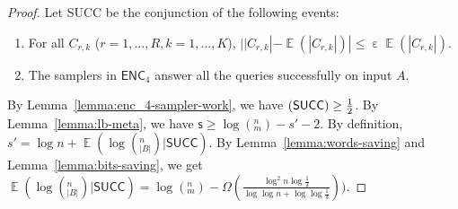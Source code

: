\documentclass[10pt]{article}
\DeclareMathOperator*{\E}{\mathbb{E}}
\let\Pr\relax
\DeclareMathOperator*{\Pr}{\mathbb{P}}
\DeclareMathOperator*{\eps}{\varepsilon}
\newcommand{\success}{\textsf{SUCC}\xspace}
\newcommand{\enc}{\textsf{ENC}\xspace}
\newcommand{\s}{\textsf{s}\xspace}
\begin{document}
\begin{proof}
  Let \success be the conjunction of the following events:
  \begin{enumerate}
    \item For all $C_{r,k}$ ($r=1,\ldots, R, k=1,\ldots, K$), $||C_{r,k}|-\E(|C_{r,k}|)|\le \eps \E(|C_{r,k}|)$.
    \item The samplers in $\enc_4$ answer all the queries successfully on input $A$.
  \end{enumerate}
  By Lemma~\ref{lemma:enc_4-sampler-work}, we have $\Pr(\success)\ge \frac{1}{2}$. By Lemma~\ref{lemma:lb-meta}, we have $\s\ge \log (^n_m) - s' -2$. By definition, $s'=\log n + \E(\log (^n_{|B|})|\success)$. By Lemma~\ref{lemma:words-saving} and Lemma~\ref{lemma:bits-saving}, we get $\E(\log (^n_{|B|})|\success)=\log (^n_m)-\Omega(\frac{\log^2 n\log{\frac{1}{\delta}}}{\log\log n+\log\log \frac{1}{\delta}}))$. 
\end{proof}



\end{document}
